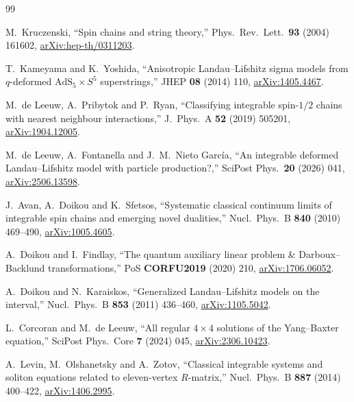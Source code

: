 \begin{thebibliography}{99}

M.~Kruczenski,
``Spin chains and string theory,''
Phys.~Rev.~Lett.~\textbf{93} (2004) 161602,
\href{https://arxiv.org/abs/hep-th/0311203}{arXiv:hep-th/0311203}.

T.~Kameyama and K.~Yoshida,
``Anisotropic Landau--Lifshitz sigma models from $q$-deformed
$\mathrm{AdS}_5\times S^5$ superstrings,''
JHEP \textbf{08} (2014) 110,
\href{https://arxiv.org/abs/1405.4467}{arXiv:1405.4467}.

M.~de Leeuw, A.~Pribytok and P.~Ryan,
``Classifying integrable spin-$1/2$ chains with nearest neighbour interactions,''
J.~Phys.~A \textbf{52} (2019) 505201,
\href{https://arxiv.org/abs/1904.12005}{arXiv:1904.12005}.

M.~de Leeuw, A.~Fontanella and J.~M.~Nieto Garc\'ia,
``An integrable deformed Landau--Lifshitz model with particle production?,''
SciPost Phys.~\textbf{20} (2026) 041,
\href{https://arxiv.org/abs/2506.13598}{arXiv:2506.13598}.

J.~Avan, A.~Doikou and K.~Sfetsos,
``Systematic classical continuum limits of integrable spin chains and emerging novel dualities,''
Nucl.~Phys.~B \textbf{840} (2010) 469--490,
\href{https://arxiv.org/abs/1005.4605}{arXiv:1005.4605}.

A.~Doikou and I.~Findlay,
``The quantum auxiliary linear problem \& Darboux--Backlund transformations,''
PoS \textbf{CORFU2019} (2020) 210,
\href{https://arxiv.org/abs/1706.06052}{arXiv:1706.06052}.

A.~Doikou and N.~Karaiskos,
``Generalized Landau--Lifshitz models on the interval,''
Nucl.~Phys.~B \textbf{853} (2011) 436--460,
\href{https://arxiv.org/abs/1105.5042}{arXiv:1105.5042}.

L.~Corcoran and M.~de Leeuw,
``All regular $4\times4$ solutions of the Yang--Baxter equation,''
SciPost Phys.~Core \textbf{7} (2024) 045,
\href{https://arxiv.org/abs/2306.10423}{arXiv:2306.10423}.

A.~Levin, M.~Olshanetsky and A.~Zotov,
``Classical integrable systems and soliton equations related to eleven-vertex $R$-matrix,''
Nucl.~Phys.~B \textbf{887} (2014) 400--422,
\href{https://arxiv.org/abs/1406.2995}{arXiv:1406.2995}.


\end{thebibliography}
